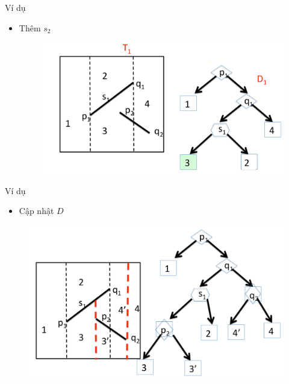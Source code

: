 \documentclass[compress]{beamer}
\begin{document}
\begin{frame}{Ví dụ}
\begin{itemize}
\item Thêm $s_2$
\begin{figure}[H]
\centering
\includegraphics[scale=0.27]{tree_search_add_segment.png}
\end{figure}
\end{itemize}
\end{frame}

\begin{frame}{Ví dụ} 
\begin{itemize}
\item Cập nhật $D$
\end{itemize}
\begin{figure}[H]
\centering
\includegraphics[scale=0.3]{tree_search_update.png}
\end{figure}
\end{frame}
\end{document}
